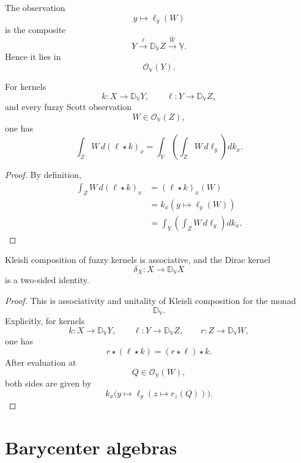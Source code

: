 The observation
\[
    y\longmapsto \ell_y(W)
\]
is the composite
\[
    Y
    \xrightarrow{\ell}
    \mathbb D_{\mathbb V}Z
    \xrightarrow{\widehat W}
    \underline{\mathbb V}.
\]
Hence it lies in
\[
    \mathcal O_{\mathbb V}(Y).
\]

\begin{theorem}
\label{thm:fuzzy-chapman-kolmogorov}
For kernels
\[
    k:X\to\mathbb D_{\mathbb V}Y,
    \qquad
    \ell:Y\to\mathbb D_{\mathbb V}Z,
\]
and every fuzzy Scott observation
\[
    W\in\mathcal O_{\mathbb V}(Z),
\]
one has
\[
    \int_Z W\,d(\ell\star k)_x
    =
    \int_Y
    \left(
        \int_Z W\,d\ell_y
    \right)
    dk_x.
\]
\end{theorem}

\begin{proof}
By definition,
\[
\begin{aligned}
    \int_Z W\,d(\ell\star k)_x
    &=
    (\ell\star k)_x(W)\\
    &=
    k_x(y\mapsto\ell_y(W))\\
    &=
    \int_Y
    \left(
        \int_Z W\,d\ell_y
    \right)
    dk_x.
\end{aligned}
\]
\end{proof}

\begin{proposition}
\label{prop:fuzzy-kernel-composition-associative}
Kleisli composition of fuzzy kernels is associative, and the Dirac kernel
\[
    \delta_X:X\to\mathbb D_{\mathbb V}X
\]
is a two-sided identity.
\end{proposition}

\begin{proof}
This is associativity and unitality of Kleisli composition for the monad
\[
    \mathbb D_{\mathbb V}.
\]
Explicitly, for kernels
\[
    k:X\to\mathbb D_{\mathbb V}Y,
    \qquad
    \ell:Y\to\mathbb D_{\mathbb V}Z,
    \qquad
    r:Z\to\mathbb D_{\mathbb V}W,
\]
one has
\[
    r\star(\ell\star k)
    =
    (r\star\ell)\star k.
\]
After evaluation at
\[
    Q\in\mathcal O_{\mathbb V}(W),
\]
both sides are given by
\[
    k_x
    \bigl(
        y\mapsto
        \ell_y
        (z\mapsto r_z(Q))
    \bigr).
\]
\end{proof}

\section{Barycenter algebras}
\label{sec:fuzzy-barycenter-algebras}

